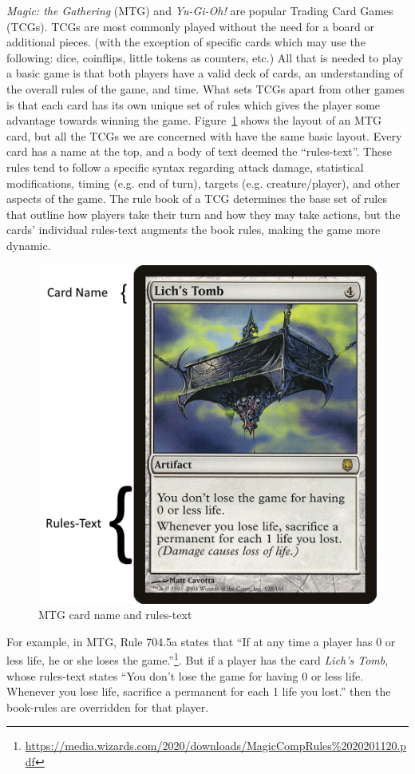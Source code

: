 \documentclass[11pt,a4paper]{article}
\begin{document}
\emph{Magic: the Gathering} (MTG) and \emph{Yu-Gi-Oh!} are popular Trading Card Games (TCGs). TCGs are most commonly played without the need for a board or additional pieces. (with the exception of specific cards which may use the following: dice, coinflips, little tokens as counters, etc.) All that is needed to play a basic game is that both players have a valid deck of cards, an understanding of the overall rules of the game, and time. What sets TCGs apart from other games is that each card has its own unique set of rules which gives the player some advantage towards winning the game. Figure~\ref{mtg-card-layout} shows the layout of an MTG card, but all the TCGs we are concerned with have the same basic layout. Every card has a name at the top, and a body of text deemed the “rules-text”. These rules tend to follow a specific syntax regarding attack damage, statistical modifications, timing (e.g. end of turn), targets (e.g. creature/player), and other aspects of the game. The rule book of a TCG determines the base set of rules that outline how players take their turn and how they may take actions, but the cards’ individual rules-text augments the book rules, making the game more dynamic.
\begin{figure}[h]
	\includegraphics[width=\linewidth]{LichsTombMTGCardAnnotation.png}
	\caption{\label{mtg-card-layout} MTG card name and rules-text }
\end{figure}
For example, in MTG, Rule 704.5a states that “If at any time a player has 0 or less life, he or she loses the game.”\footnote{\url{https://media.wizards.com/2020/downloads/MagicCompRules\%2020201120.pdf}}. But if a player has the card \emph{Lich’s Tomb}, whose rules-text states “You don't lose the game for having 0 or less life. Whenever you lose life, sacrifice a permanent for each 1 life you lost.” then the book-rules are overridden for that player.
\end{document}

